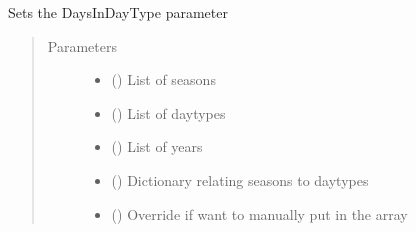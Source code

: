 \documentclass[a4paper,12pt,english]{article}
\begin{document}
\begin{fulllineitems}

\begin{fulllineitems}
\label{\detokenize{GOCPI:GOCPI.CreateCases.CreateCases.set_days_in_day_type}}
Sets the DaysInDayType parameter
\begin{quote}\begin{description}
\item[{Parameters}] \leavevmode\begin{itemize}
\item {} 
 () \textendash{} List of seasons

\item {} 
 () \textendash{} List of daytypes

\item {} 
 () \textendash{} List of years

\item {} 
 () \textendash{} Dictionary relating seasons to daytypes

\item {} 
 (\sphinxstyleliteralemphasis{\sphinxupquote{, }}) \textendash{} Override if want to manually put in the array

\end{itemize}

\end{description}\end{quote}

\end{fulllineitems}



\end{fulllineitems}
\end{document}
